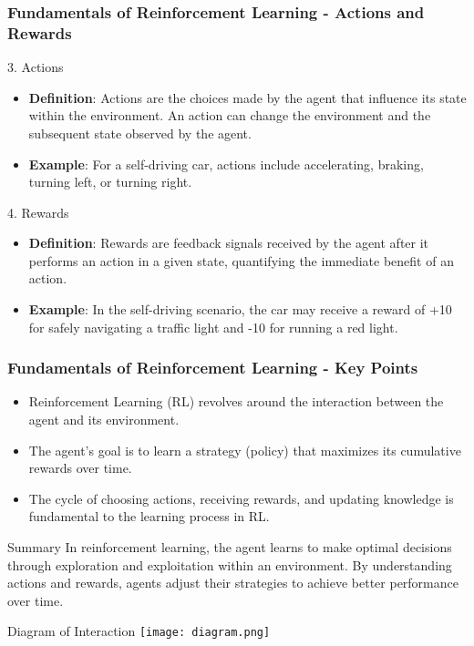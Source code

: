 \documentclass[aspectratio=169]{beamer}
\begin{document}
\begin{frame}[fragile]
    \frametitle{Fundamentals of Reinforcement Learning - Actions and Rewards}
    \begin{block}{3. Actions}
        \begin{itemize}
            \item \textbf{Definition}: Actions are the choices made by the agent that influence its state within the environment. An action can change the environment and the subsequent state observed by the agent.
            \item \textbf{Example}: For a self-driving car, actions include accelerating, braking, turning left, or turning right.
        \end{itemize}
    \end{block}

    \begin{block}{4. Rewards}
        \begin{itemize}
            \item \textbf{Definition}: Rewards are feedback signals received by the agent after it performs an action in a given state, quantifying the immediate benefit of an action.
            \item \textbf{Example}: In the self-driving scenario, the car may receive a reward of +10 for safely navigating a traffic light and -10 for running a red light.
        \end{itemize}
    \end{block}
\end{frame}

\begin{frame}[fragile]
    \frametitle{Fundamentals of Reinforcement Learning - Key Points}
    \begin{itemize}
        \item Reinforcement Learning (RL) revolves around the interaction between the agent and its environment.
        \item The agent’s goal is to learn a strategy (policy) that maximizes its cumulative rewards over time.
        \item The cycle of choosing actions, receiving rewards, and updating knowledge is fundamental to the learning process in RL.
    \end{itemize}

    \begin{block}{Summary}
        In reinforcement learning, the agent learns to make optimal decisions through exploration and exploitation within an environment. By understanding actions and rewards, agents adjust their strategies to achieve better performance over time.
    \end{block}
    
    \begin{block}{Diagram of Interaction}
    \centering
    \texttt{[image: diagram.png]} %
    \end{block}
\end{frame}
\end{document}
